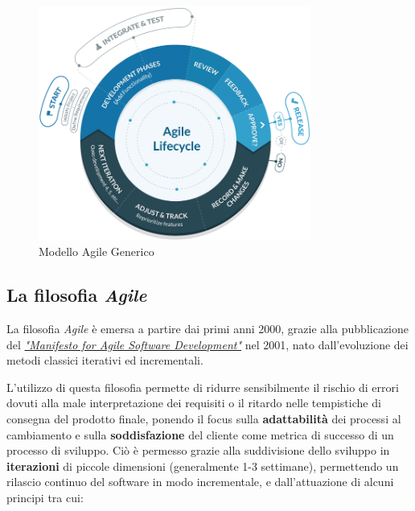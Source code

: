 \documentclass[a4paper,12pt]{report}
\begin{document}
			\begin{figure}[h]
				\centering
				\includegraphics[width=0.8\textwidth]{agile}
				\caption{Modello Agile Generico}
				\label{fig:agile_generic}
			\end{figure}
	
			\subsection{La filosofia \emph{Agile}}
				
				La filosofia \emph{Agile} è emersa a partire dai primi anni 2000, grazie alla pubblicazione del \href{https://agilemanifesto.org/iso/it/principles.html}{\emph{"Manifesto for Agile Software Development"}} nel 2001, nato dall'evoluzione dei metodi classici iterativi ed incrementali.
				
				L'utilizzo di questa filosofia permette di ridurre sensibilmente il rischio di errori dovuti alla male interpretazione dei
				requisiti o il ritardo nelle tempistiche di consegna del prodotto finale, ponendo il focus sulla \textbf{adattabilità} dei processi al cambiamento e sulla \textbf{soddisfazione} del cliente come metrica di successo di un processo di sviluppo.
				Ciò è permesso grazie alla suddivisione dello sviluppo in \textbf{iterazioni} di piccole dimensioni (generalmente 1-3 settimane),
				permettendo un rilascio continuo del software in modo incrementale, e dall'attuazione di alcuni principi tra cui:
				
\end{document}

